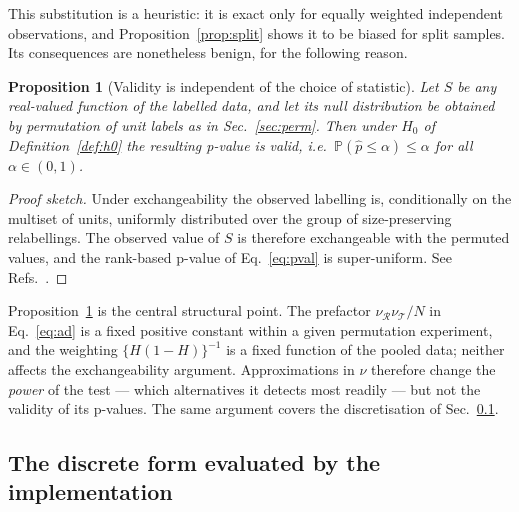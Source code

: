 \documentclass[11pt,a4paper]{article}
\theoremstyle{definition}
\theoremstyle{plain}
\newtheorem{proposition}{Proposition}[section]
\theoremstyle{remark}
\newcommand{\Rr}{\mathcal{R}}
\newcommand{\Tt}{\mathcal{T}}
\newcommand{\Prob}{\mathbb{P}}
\begin{document}
This substitution is a heuristic: it is exact only for equally weighted
independent observations, and Proposition~\ref{prop:split} shows it to be biased
for split samples. Its consequences are nonetheless benign, for the following
reason.

\begin{proposition}[Validity is independent of the choice of statistic]
\label{prop:valid}
Let $S$ be \emph{any} real-valued function of the labelled data, and let its
null distribution be obtained by permutation of unit labels as in
Sec.~\ref{sec:perm}. Then under $H_0$ of Definition~\ref{def:h0} the resulting
p-value is valid, i.e.\ $\Prob(\hat{p} \le \alpha) \le \alpha$ for all
$\alpha \in (0,1)$.
\end{proposition}

\begin{proof}[Proof sketch]
Under exchangeability the observed labelling is, conditionally on the multiset
of units, uniformly distributed over the group of size-preserving relabellings.
The observed value of $S$ is therefore exchangeable with the permuted values,
and the rank-based p-value of Eq.~\eqref{eq:pval} is super-uniform. See
Refs.~\cite{Fisher1935,Pitman1937,LehmannRomano2005}.
\end{proof}

Proposition~\ref{prop:valid} is the central structural point. The prefactor
$\nu_\Rr\nu_\Tt/N$ in Eq.~\eqref{eq:ad} is a fixed positive constant within a
given permutation experiment, and the weighting $\{H(1-H)\}^{-1}$ is a fixed
function of the pooled data; neither affects the exchangeability argument.
Approximations in $\nu$ therefore change the \emph{power} of the test --- which
alternatives it detects most readily --- but not the validity of its p-values.
The same argument covers the discretisation of Sec.~\ref{sec:discrete}.

\subsection{The discrete form evaluated by the implementation}
\label{sec:discrete}
\end{document}
